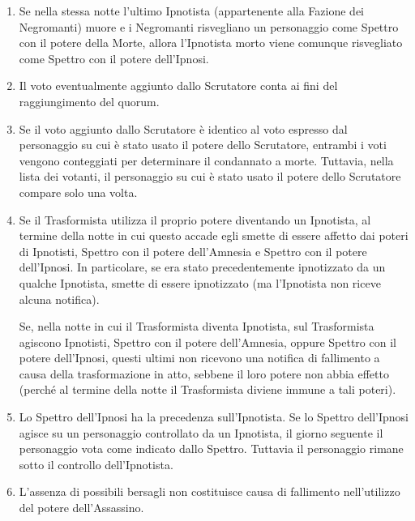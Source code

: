 \documentclass[a4paper,10pt]{article}
\begin{document}
\begin{enumerate}
 \item Se nella stessa notte l'ultimo Ipnotista (appartenente alla Fazione dei Negromanti) muore e i Negromanti risvegliano un personaggio come Spettro con il potere della Morte, allora l'Ipnotista morto viene comunque risvegliato come Spettro con il potere dell'Ipnosi.
 
 \item Il voto eventualmente aggiunto dallo Scrutatore conta ai fini del raggiungimento del quorum.
 
 \item Se il voto aggiunto dallo Scrutatore è identico al voto espresso dal personaggio su cui è stato usato il potere dello Scrutatore, entrambi i voti vengono conteggiati per determinare il condannato a morte.
 Tuttavia, nella lista dei votanti, il personaggio su cui è stato usato il potere dello Scrutatore compare solo una volta.
 
 \item Se il Trasformista utilizza il proprio potere diventando un Ipnotista, al termine della notte in cui questo accade egli smette di essere affetto dai poteri di Ipnotisti, Spettro con il potere dell'Amnesia e Spettro con il potere dell'Ipnosi. In particolare, se era stato precedentemente ipnotizzato da un qualche Ipnotista, smette di essere ipnotizzato (ma l'Ipnotista non riceve alcuna notifica).
 
 Se, nella notte in cui il Trasformista diventa Ipnotista, sul Trasformista agiscono Ipnotisti, Spettro con il potere dell'Amnesia, oppure Spettro con il potere dell'Ipnosi, questi ultimi non ricevono una notifica di fallimento a causa della trasformazione in atto, sebbene il loro potere non abbia effetto (perché al termine della notte il Trasformista diviene immune a tali poteri).
 
 \item Lo Spettro dell'Ipnosi ha la precedenza sull'Ipnotista. Se lo Spettro dell'Ipnosi agisce su un personaggio controllato da un Ipnotista, il giorno seguente il personaggio vota come indicato dallo Spettro. Tuttavia il personaggio rimane sotto il controllo dell'Ipnotista.
 
 \item L'assenza di possibili bersagli non costituisce causa di fallimento nell'utilizzo del potere dell'Assassino.
\end{enumerate}



\printindex
\end{document}
